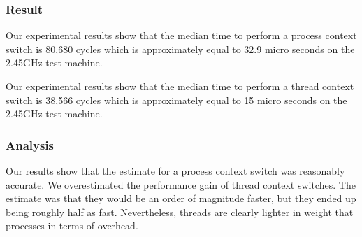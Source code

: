 \subsubsection{Result}

Our experimental results show that the median time to perform a process context
switch is 80,680 cycles which is approximately equal to 32.9 micro seconds on the
2.45GHz test machine. 

Our experimental results show that the median time to perform a thread context
switch is 38,566 cycles which is approximately equal to 15 micro seconds on the
2.45GHz test machine.

\subsubsection{Analysis}

Our results show that the estimate for a process context switch was reasonably 
accurate. We overestimated the performance gain of thread context switches. The 
estimate was that they would be an order of magnitude faster, but they ended up
 being roughly half as fast. Nevertheless, threads are clearly lighter in weight 
 that processes in terms of overhead.

